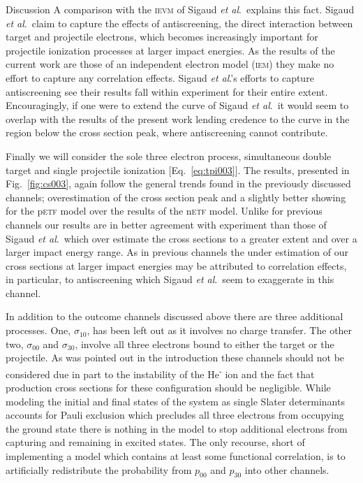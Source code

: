\documentclass[aps, pra, reprint, groupedaddress, amsfonts, longbibliography,
               amsmath, amssymb, showpacs, nofootinbib]{revtex4-1}
\begin{document}
\begin{section}{Discussion \label{sec:disc}}
   A comparison with the \textsc{ievm} of Sigaud \textit{et al}.\ explains this fact. Sigaud
   \textit{et al}.\ claim to capture the effects of antiscreening, the direct interaction between target
   and projectile electrons, which becomes increasingly important for projectile ionization processes at
   larger impact energies. As the results of the current work are those of an independent
   electron model (\textsc{iem}) they make no effort to capture any correlation effects. Sigaud 
   \textit{et al}.'s efforts to capture antiscreening see their results fall within experiment for their
   entire extent. Encouragingly, if one were to extend the curve of Sigaud \textit{et al}.\ it would
   seem to overlap with the results of the present work lending credence to the curve in the region
   below the cross section peak, where antiscreening cannot contribute.

   Finally we will consider the sole three electron process, simultaneous double target and single
   projectile ionization [Eq.~\eqref{eq:tpi003}]. The results, presented in Fig.~\ref{fig:cs003}, again
   follow the general trends found in the previously discussed channels; overestimation of the cross
   section peak and a slightly better showing for the p\textsc{etf} model over the results of the
   n\textsc{etf} model. Unlike for previous channels our results are in better agreement with experiment
   than those of Sigaud \textit{et al}.\ which over estimate the cross sections to a greater extent and
   over a larger impact energy range. As in previous channels the under estimation of our cross sections
   at larger impact energies may be attributed to correlation effects, in particular, to antiscreening
   which  Sigaud \textit{et al}.\ seem to exaggerate in this channel.

   In addition to the outcome channels discussed above there are three additional processes. One,
   $\sigma_{10}$, has been left out as it involves no charge transfer. The other two, $\sigma_{00}$ and
   $\sigma_{30}$, involve all three electrons bound to either the target or the projectile. As was
   pointed out in the introduction these channels should not be considered due in part to the
   instability of the He\textsuperscript{-} ion and the fact that production cross sections for these
   configuration should be negligible. While modeling the initial and final states of the system as
   single Slater determinants accounts for Pauli exclusion which precludes all three electrons from
   occupying the ground state there is nothing in the model to stop additional electrons from capturing
   and remaining in excited states. The only recourse, short of implementing a model which contains at
   least some functional correlation, is to artificially redistribute the probability from $p_{00}$ and
   $p_{30}$ into other channels.


\end{section}
\end{document}
